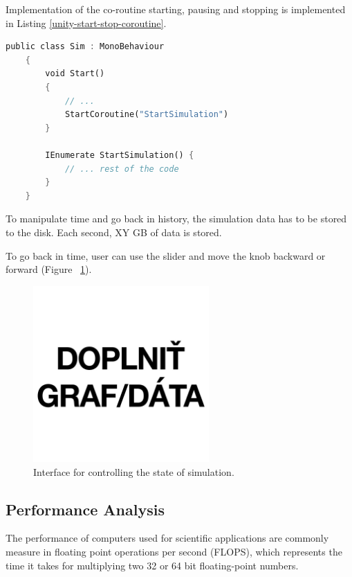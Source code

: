 Implementation of the co-routine starting, pausing and stopping is implemented in Listing \ref{unity-start-stop-coroutine}.

\begin{lstlisting}[language=Rust, caption="Starting\, pausing and stopping the co-routines in Unity.", label=unity-start-stop-coroutine]
	public class Sim : MonoBehaviour
	{
		void Start()
		{
			// ...
			StartCoroutine("StartSimulation")
		}
		
		IEnumerate StartSimulation() {
			// ... rest of the code
		}
	}
\end{lstlisting}

To manipulate time and go back in history, the simulation data has to be stored to the disk. Each second, XY GB of data is stored. 

To go back in time, user can use the slider and move the knob backward or forward (Figure~ \ref{fig:unity-time-manipulation}).

\begin{figure}[!ht]
	\centering
	\includegraphics[width=0.6\textwidth]{figures/empty.jpg}
	\caption{Interface for controlling the state of simulation.}
	\label{fig:unity-time-manipulation}
\end{figure}


\subsection{Performance Analysis}\label{perf-analysis}
The performance of computers used for scientific applications are commonly measure in floating point operations per second (FLOPS), which represents the time it takes for multiplying two 32 or 64 bit floating-point numbers.

